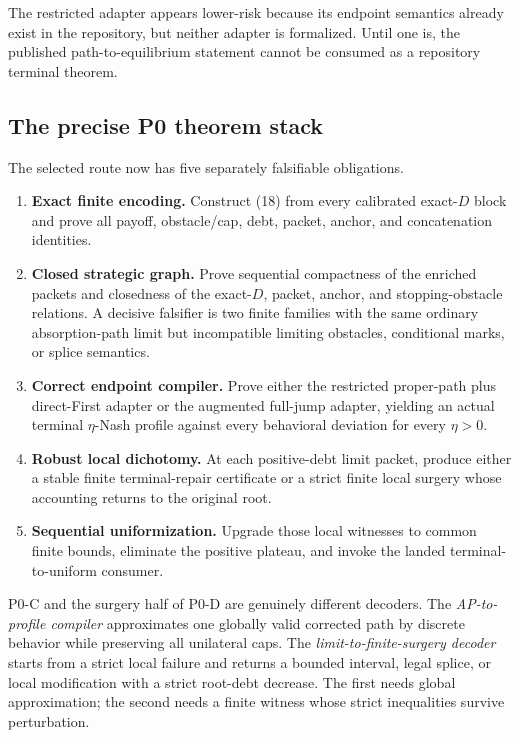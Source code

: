 \documentclass[11pt]{article}
\begin{document}
The restricted adapter appears lower-risk because its endpoint semantics
already exist in the repository, but neither adapter is formalized.  Until one
is, the published path-to-equilibrium statement cannot be consumed as a
repository terminal theorem.

\subsection{The precise P0 theorem stack}

The selected route now has five separately falsifiable obligations.

\begin{enumerate}
\item[\textbf{P0-A.}] \textbf{Exact finite encoding.}  Construct (18) from
every calibrated exact-$D$ block and prove all payoff, obstacle/cap, debt,
packet, anchor, and concatenation identities.
\item[\textbf{P0-B.}] \textbf{Closed strategic graph.}  Prove sequential
compactness of the enriched packets and closedness of the exact-$D$, packet,
anchor, and stopping-obstacle relations.  A decisive falsifier is two finite
families with the same ordinary absorption-path limit but incompatible
limiting obstacles, conditional marks, or splice semantics.
\item[\textbf{P0-C.}] \textbf{Correct endpoint compiler.}  Prove either the
restricted proper-path plus direct-First adapter or the augmented full-jump
adapter, yielding an actual terminal $\eta$-Nash profile against every
behavioral deviation for every $\eta>0$.
\item[\textbf{P0-D.}] \textbf{Robust local dichotomy.}  At each positive-debt
limit packet, produce either a stable finite terminal-repair certificate or a
strict finite local surgery whose accounting returns to the original root.
\item[\textbf{P0-E.}] \textbf{Sequential uniformization.}  Upgrade those local
witnesses to common finite bounds, eliminate the positive plateau, and invoke
the landed terminal-to-uniform consumer.
\end{enumerate}

P0-C and the surgery half of P0-D are genuinely different decoders.  The
\emph{AP-to-profile compiler} approximates one globally valid corrected path by
discrete behavior while preserving all unilateral caps.  The
\emph{limit-to-finite-surgery decoder} starts from a strict local failure and
returns a bounded interval, legal splice, or local modification with a strict
root-debt decrease.  The first needs global approximation; the second needs a
finite witness whose strict inequalities survive perturbation.
\end{document}
